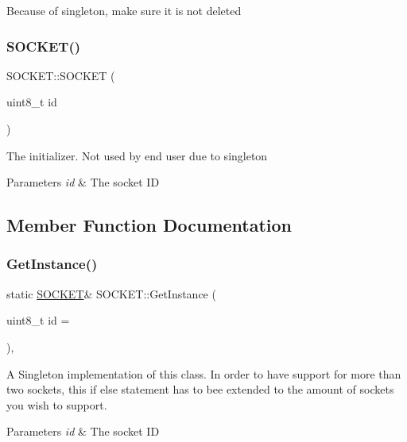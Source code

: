 Because of singleton, make sure it is not deleted \hypertarget{class_s_o_c_k_e_t_ab87e109918e43ba097c153114f4f6494}{}\label{class_s_o_c_k_e_t_ab87e109918e43ba097c153114f4f6494} 
\subsubsection{\texorpdfstring{S\+O\+C\+K\+E\+T()}{SOCKET()}\hspace{0.1cm}{\footnotesize\ttfamily [2/2]}}
{\footnotesize\ttfamily S\+O\+C\+K\+E\+T\+::\+S\+O\+C\+K\+ET (\begin{DoxyParamCaption}\item[{uint8\+\_\+t}]{id }\end{DoxyParamCaption})\hspace{0.3cm}{\ttfamily [inline]}}

The initializer. Not used by end user due to singleton 
\begin{DoxyParams}{Parameters}
{\em id} & The socket ID \\
\hline
\end{DoxyParams}


\subsection{Member Function Documentation}
\hypertarget{class_s_o_c_k_e_t_acd81e49443c51d84f7bfe5d616d1b750}{}\label{class_s_o_c_k_e_t_acd81e49443c51d84f7bfe5d616d1b750} 
\subsubsection{\texorpdfstring{Get\+Instance()}{GetInstance()}}
{\footnotesize\ttfamily static \hyperlink{class_s_o_c_k_e_t}{S\+O\+C\+K\+ET}\& S\+O\+C\+K\+E\+T\+::\+Get\+Instance (\begin{DoxyParamCaption}\item[{uint8\+\_\+t}]{id = {} }\end{DoxyParamCaption})\hspace{0.3cm}{\ttfamily [inline]}, {\ttfamily [static]}}

A Singleton implementation of this class. In order to have support for more than two sockets, this if else statement has to bee extended to the amount of sockets you wish to support. 
\begin{DoxyParams}{Parameters}
{\em id} & The socket ID \\
\hline
\end{DoxyParams}
\hypertarget{class_s_o_c_k_e_t_a7c3771b6f958ea3566fab32ea094d0ff}{}\label{class_s_o_c_k_e_t_a7c3771b6f958ea3566fab32ea094d0ff} 
